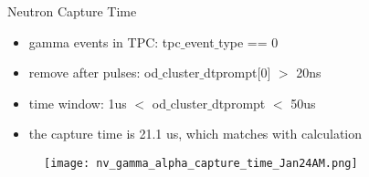 \documentclass[9pt]{beamer}
\begin{document}

\begin{frame}{Neutron Capture Time}
\begin{itemize}
[bullet]
\item gamma events in TPC: tpc$\_$event$\_$type == 0
\item remove after pulses: od$\_$cluster$\_$dtprompt[0] $>$ 20ns
\item time window: 1us $<$ od$\_$cluster$\_$dtprompt $<$ 50us
\item the capture time is 21.1 us, which matches with calculation
\end{itemize}
\begin{figure}
\texttt{[image: nv\_gamma\_alpha\_capture\_time\_Jan24AM.png]}
\end{figure}
\end{frame}


\end{document}

